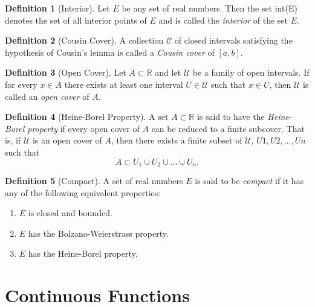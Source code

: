 \documentclass[11pt]{article}
\def \R {\mathbb{R}}
\def \scriptC {\mathcal{C}}
\def \scriptU {\mathcal{U}}
\theoremstyle{definition}
\newtheorem{definition}{Definition}[section]
\begin{document}
\setcounter{definition}{13}
\begin{definition} [Interior]
	Let $ E $ be any set of real numbers. Then the set int(E) denotes the set of all interior points of $ E $ and is called the \textit{interior} of the set $ E $.
\end{definition}

\setcounter{definition}{26}
\begin{definition} [Cousin Cover]
	A collection $ \scriptC $ of closed intervals satisfying the hypothesis of Cousin’s
	lemma is called a \textit{Cousin cover} of $ [a, b] $.
\end{definition}

\begin{definition} [Open Cover]
	Let $ A \subset \R $ and let $ \scriptU $ be a family of open intervals. If for every $ x \in A $ there exists at least one interval $ U \in \scriptU $ such that $ x \in U $, then $ \scriptU $ is called an \textit{open cover} of $ A $.
\end{definition}


\begin{definition} [Heine-Borel Property]
	A set $ A \subset \R $ is said to have the \textit{Heine-Borel property} if every open cover of $ A $ can be reduced to a finite subcover. That is, if $ \scriptU $ is an open cover of $ A $, then there exists a
	finite subset of $ \scriptU $, $ {U1, U2, \dots , Un} $ such that  
	$$ A \subset U_1 \cup U_2 \cup \dots \cup U_n.$$
\end{definition}

\setcounter{definition}{33}
\begin{definition} [Compact]
	A set of real numbers $ E $ is said to be \textit{compact} if it has any of the following equivalent
	properties:

	\begin{enumerate}
		\item $ E $ is closed and bounded.
		\item $ E $ has the Bolzano-Weierstrass property.
		\item $ E $ has the Heine-Borel property.
	\end{enumerate}
	
\end{definition}


\section{Continuous Functions}
\end{document}
